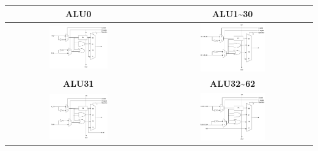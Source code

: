 \documentclass[12pt]{article}
\begin{document}
\begin{center}
    \begin{table}[h]
        \centering
        \begin{tabular}{|c|c|}
            \hline
            \textbf{ALU0} & \textbf{ALU1\textasciitilde 30} \\
            \hline
            \includegraphics[width=0.42\textwidth]{./img/q1_bit0.png} & 
            \includegraphics[width=0.42\textwidth]{./img/q1_bit1-30.png} \\
            \hline
            \textbf{ALU31} & \textbf{ALU32\textasciitilde 62} \\
            \hline
            \includegraphics[width=0.42\textwidth]{./img/q1_bit31.png} &
            \includegraphics[width=0.42\textwidth]{./img/q1_bit32-62.png} \\

\end{tabular}
\end{table}
\end{center}
\end{document}
